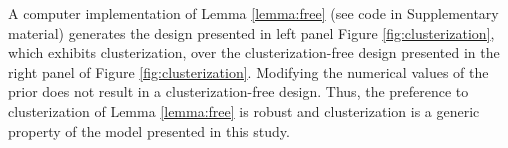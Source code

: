 A computer implementation of Lemma \ref{lemma:free} (see code in
Supplementary material) generates the design presented in left panel
Figure \ref{fig:clusterization}, which exhibits clusterization, over
the clusterization-free design presented in the right panel of Figure
\ref{fig:clusterization}. Modifying the numerical values of the prior
does not result in a clusterization-free design. Thus, the preference
to clusterization of Lemma \ref{lemma:free} is robust and
clusterization is a generic property of the model presented in this
study.

\clusterization


\noclusterization

